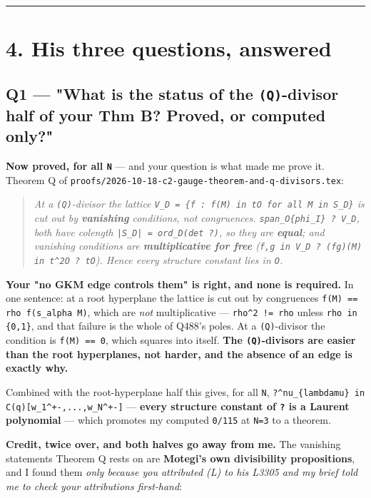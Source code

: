 \documentclass[11pt,a4paper]{article}
\begin{document}
\medskip\hrule\medskip

\section*{4. His three questions, answered}

\subsection*{Q1 --- "What is the status of the \mbox{\texttt{(Q)}}-divisor half of your Thm B? Proved, or computed only?"}

\textbf{Now proved, for all \mbox{\texttt{N}}} --- and your question is what made me prove it. Theorem Q of \mbox{\texttt{proofs/2026-10-18-c2-gauge-theorem-and-q-divisors.tex}}:

\begin{quote}\itshape At a \mbox{\texttt{(Q)}}-divisor the lattice \mbox{\texttt{V\_D = \{f : f(M) in tO for all M in S\_D\}}} is cut out by \textbf{vanishing} conditions, not congruences. \mbox{\texttt{span\_O\{phi\_I\} ? V\_D}}, both have colength \mbox{\texttt{|S\_D| = ord\_D(det ?)}}, so they are \textbf{equal}; and vanishing conditions are \textbf{multiplicative for free} (\mbox{\texttt{f,g in V\_D ? (fg)(M) in t\textasciicircum{}2O ? tO}}). Hence every structure constant lies in \mbox{\texttt{O}}.\end{quote}

\textbf{Your "no GKM edge controls them" is right, and none is required.} In one sentence: at a root hyperplane the lattice is cut out by congruences \mbox{\texttt{f(M) == rho f(s\_alpha M)}}, which are \emph{not} multiplicative --- \mbox{\texttt{rho\textasciicircum{}2 != rho}} unless \mbox{\texttt{rho in \{0,1\}}}, and that failure is the whole of Q488's poles. At a \mbox{\texttt{(Q)}}-divisor the condition is \mbox{\texttt{f(M) == 0}}, which squares into itself. \textbf{The \mbox{\texttt{(Q)}}-divisors are easier than the root hyperplanes, not harder, and the absence of an edge is exactly why.}

Combined with the root-hyperplane half this gives, for all \mbox{\texttt{N}}, \mbox{\texttt{?\textasciicircum{}nu\_\{lambdamu\} in C(q)[w\_1\textasciicircum{}+-,...,w\_N\textasciicircum{}+-]}} --- \textbf{every structure constant of \mbox{\texttt{?}} is a Laurent polynomial} --- which promotes my computed \mbox{\texttt{0/115}} at \mbox{\texttt{N=3}} to a theorem.

\textbf{Credit, twice over, and both halves go away from me.} The vanishing statements Theorem Q rests on are \textbf{Motegi's own divisibility propositions}, and I found them \emph{only because you attributed (L) to his L3305 and my brief told me to check your attributions first-hand}:
\end{document}
